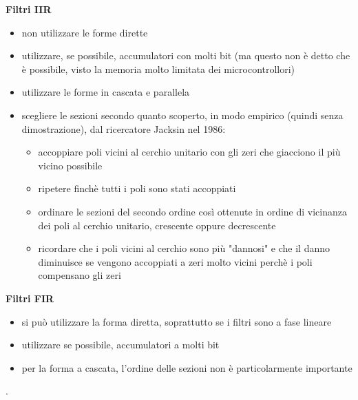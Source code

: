 \textbf{Filtri IIR} \newline 

\begin{itemize}
    \item non utilizzare le forme dirette 
    \item utilizzare, se possibile, accumulatori con molti bit (ma questo non è detto che è possibile, visto la memoria molto limitata dei microcontrollori)
    \item utilizzare le forme in cascata e parallela 
    \item scegliere le sezioni secondo quanto scoperto, in modo empirico (quindi senza dimostrazione), dal ricercatore Jacksin nel 1986: 
    \begin{itemize}
        \item accoppiare poli vicini al cerchio unitario con gli zeri che giacciono il più vicino possibile 
        \item ripetere finchè tutti i poli sono stati accoppiati 
        \item ordinare le sezioni del secondo ordine così ottenute in ordine di vicinanza dei poli al cerchio unitario, crescente oppure decrescente 
        \item ricordare che i poli vicini al cerchio sono più "dannosi" e che il danno diminuisce se vengono accoppiati a zeri molto vicini perchè i poli compensano gli zeri  
    \end{itemize}
\end{itemize}

\textbf{Filtri FIR} \newline 

\begin{itemize}
    \item si può utilizzare la forma diretta, soprattutto se i filtri sono a fase lineare 
    \item utilizzare se possibile, accumulatori a molti bit 
    \item per la forma a cascata, l'ordine delle sezioni non è particolarmente importante 
\end{itemize}

\newpage 
.

\newpage 


